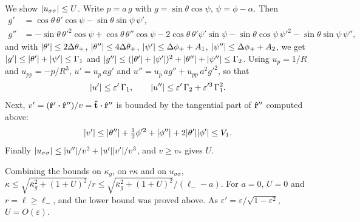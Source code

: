 We show \(\abs{u_{\sigma\sigma}}\le U\).
Write \(p = a\,g\) with \(g = \sin\theta\cos\psi\), \(\psi = \phi-\alpha\).
Then
\begin{equation}
\begin{split}
    g' &= \cos\theta\,\theta'\cos\psi - \sin\theta\sin\psi\,\psi', \\
    g'' &= -\sin\theta\,\theta'^2\cos\psi + \cos\theta\,\theta''\cos\psi - 2\cos\theta\,\theta'\psi'\sin\psi - \sin\theta\cos\psi\,\psi'^2 - \sin\theta\sin\psi\,\psi'' ,
\end{split}
\end{equation}
and with \(\abs{\theta'}\le2\Delta\theta_+\), \(\abs{\theta''}\le4\Delta\theta_+\), \(\abs{\psi'}\le\Delta\phi_++A_1\), \(\abs{\psi''}\le\Delta\phi_++A_2\), we get \(\abs{g'}\le\abs{\theta'}+\abs{\psi'}\le\Gamma_1\) and \(\abs{g''}\le(\abs{\theta'}+\abs{\psi'})^2 + \abs{\theta''} + \abs{\psi''}\le\Gamma_2\).
Using \(u_p = 1/R\) and \(u_{pp} = -p/R^3\), \(u' = u_p\,a g'\) and \(u'' = u_p\,a g'' + u_{pp}\,a^2g'^2\), so that
\begin{equation}
    \abs{u'}\le\varepsilon'\,\Gamma_1, \qquad \abs{u''}\le\varepsilon'\,\Gamma_2 + \varepsilon'^3\,\Gamma_1^2 .
\end{equation}
Next, \(v' = (\vu r'\vdot\vu r'')/v = \vu t\vdot\vu r''\) is bounded by the tangential part of \(\vu r''\) computed above:
\begin{equation}
    \abs{v'}\le\abs{\theta''} + \tfrac12\phi'^2 + \abs{\phi''} + 2\abs{\theta'}\abs{\phi'}\le V_1 .
\end{equation}
Finally \(\abs{u_{\sigma\sigma}}\le\abs{u''}/v^2 + \abs{u'}\abs{v'}/v^3\), and \(v\ge v_*\) gives \(U\).

Combining the bounds on \(\kappa_g\), on \(r\kappa\) and on \(u_{\sigma\sigma}\), \(\kappa\le\sqrt{\bar\kappa_g^2 + (1+U)^2}/r\le\sqrt{\bar\kappa_g^2 + (1+U)^2}/(\ell_--a)\).
For \(a=0\), \(U=0\) and \(r=\ell\ge\ell_-\), and the lower bound was proved above.
As \(\varepsilon' = \varepsilon/\sqrt{1-\varepsilon^2}\), \(U = O(\varepsilon)\).

